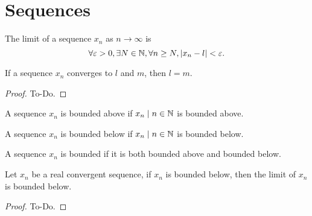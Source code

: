 \chapter{Sequences}\label{cha:sequences}

\begin{definition}\label{def:seqlimit}
     \leanok
    The limit of a sequence $x_n$ as $n \to \infty$ is
    \[
    \forall \varepsilon > 0, \exists N \in \mathbb{N}, \forall n \geq N, |x_n - l| < \varepsilon.
    \]
\end{definition}

\begin{theorem}\label{thm:seqlimitunique}
     \leanok
    If a sequence $x_n$ converges to $l$ and $m$,
    then $l = m$.
\end{theorem}
\begin{proof}
    To-Do.
\end{proof}

\begin{definition}\label{def:seqboundabove}
     \leanok
    A sequence $x_n$ is bounded above if ${x_n \mid n \in \mathbb{N}}$ is bounded above.
\end{definition}

\begin{definition}\label{def:seqboundbelow}
     \leanok
    A sequence $x_n$ is bounded below if ${x_n \mid n \in \mathbb{N}}$ is bounded below.
\end{definition}

\begin{definition}\label{def:seqbound}
     \leanok
    A sequence $x_n$ is bounded if it is both bounded above and bounded below.
\end{definition}

\begin{lemma}\label{lem:seqboundbelow_limboundbelow}
     \leanok
    Let $x_n$ be a real convergent sequence,
    if $x_n$ is bounded below,
    then the limit of $x_n$ is bounded below.
\end{lemma}
\begin{proof}
    To-Do.
\end{proof}

